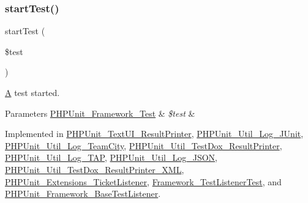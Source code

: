 \mbox{\label{interface_p_h_p_unit___framework___test_listener_a1a9bddc54f26bb3fb5c2ec9778ea5198}} 
\subsubsection{\texorpdfstring{start\+Test()}{startTest()}}
{\footnotesize\ttfamily start\+Test (\begin{DoxyParamCaption}\item[{\mbox{\hyperlink{interface_p_h_p_unit___framework___test}{P\+H\+P\+Unit\+\_\+\+Framework\+\_\+\+Test}}}]{\$test }\end{DoxyParamCaption})}

\mbox{\hyperlink{class_a}{A}} test started.


\begin{DoxyParams}[1]{Parameters}
\mbox{\hyperlink{interface_p_h_p_unit___framework___test}{P\+H\+P\+Unit\+\_\+\+Framework\+\_\+\+Test}} & {\em \$test} & \\
\hline
\end{DoxyParams}


Implemented in \mbox{\hyperlink{class_p_h_p_unit___text_u_i___result_printer_a1a9bddc54f26bb3fb5c2ec9778ea5198}{P\+H\+P\+Unit\+\_\+\+Text\+U\+I\+\_\+\+Result\+Printer}}, \mbox{\hyperlink{class_p_h_p_unit___util___log___j_unit_a1a9bddc54f26bb3fb5c2ec9778ea5198}{P\+H\+P\+Unit\+\_\+\+Util\+\_\+\+Log\+\_\+\+J\+Unit}}, \mbox{\hyperlink{class_p_h_p_unit___util___log___team_city_a1a9bddc54f26bb3fb5c2ec9778ea5198}{P\+H\+P\+Unit\+\_\+\+Util\+\_\+\+Log\+\_\+\+Team\+City}}, \mbox{\hyperlink{class_p_h_p_unit___util___test_dox___result_printer_a1a9bddc54f26bb3fb5c2ec9778ea5198}{P\+H\+P\+Unit\+\_\+\+Util\+\_\+\+Test\+Dox\+\_\+\+Result\+Printer}}, \mbox{\hyperlink{class_p_h_p_unit___util___log___t_a_p_a1a9bddc54f26bb3fb5c2ec9778ea5198}{P\+H\+P\+Unit\+\_\+\+Util\+\_\+\+Log\+\_\+\+T\+AP}}, \mbox{\hyperlink{class_p_h_p_unit___util___log___j_s_o_n_a1a9bddc54f26bb3fb5c2ec9778ea5198}{P\+H\+P\+Unit\+\_\+\+Util\+\_\+\+Log\+\_\+\+J\+S\+ON}}, \mbox{\hyperlink{class_p_h_p_unit___util___test_dox___result_printer___x_m_l_a1a9bddc54f26bb3fb5c2ec9778ea5198}{P\+H\+P\+Unit\+\_\+\+Util\+\_\+\+Test\+Dox\+\_\+\+Result\+Printer\+\_\+\+X\+ML}}, \mbox{\hyperlink{class_p_h_p_unit___extensions___ticket_listener_a1a9bddc54f26bb3fb5c2ec9778ea5198}{P\+H\+P\+Unit\+\_\+\+Extensions\+\_\+\+Ticket\+Listener}}, \mbox{\hyperlink{class_framework___test_listener_test_a1a9bddc54f26bb3fb5c2ec9778ea5198}{Framework\+\_\+\+Test\+Listener\+Test}}, and \mbox{\hyperlink{class_p_h_p_unit___framework___base_test_listener_a1a9bddc54f26bb3fb5c2ec9778ea5198}{P\+H\+P\+Unit\+\_\+\+Framework\+\_\+\+Base\+Test\+Listener}}.

